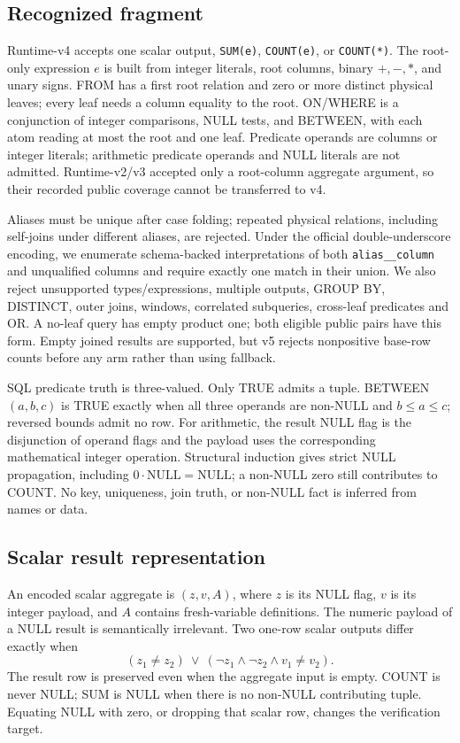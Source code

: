 \documentclass[3p,times,authoryear]{elsarticle}
\newcommand{\NULL}{\mathrm{NULL}}
\begin{document}
\subsection{Recognized fragment}
Runtime-v4 accepts one scalar output, \texttt{SUM(e)}, \texttt{COUNT(e)}, or \texttt{COUNT(*)}. The root-only expression $e$ is built from integer literals, root columns, binary $+,-,*$, and unary signs. FROM has a first root relation and zero or more distinct physical leaves; every leaf needs a column equality to the root. ON/WHERE is a conjunction of integer comparisons, NULL tests, and BETWEEN, with each atom reading at most the root and one leaf. Predicate operands are columns or integer literals; arithmetic predicate operands and NULL literals are not admitted. Runtime-v2/v3 accepted only a root-column aggregate argument, so their recorded public coverage cannot be transferred to v4.

Aliases must be unique after case folding; repeated physical relations, including self-joins under different aliases, are rejected. Under the official double-underscore encoding, we enumerate schema-backed interpretations of both \texttt{alias\_\_column} and unqualified columns and require exactly one match in their union. We also reject unsupported types/expressions, multiple outputs, GROUP BY, DISTINCT, outer joins, windows, correlated subqueries, cross-leaf predicates and OR. A no-leaf query has empty product one; both eligible public pairs have this form. Empty joined results are supported, but v5 rejects nonpositive base-row counts before any arm rather than using fallback.

SQL predicate truth is three-valued. Only TRUE admits a tuple. BETWEEN$(a,b,c)$ is TRUE exactly when all three operands are non-NULL and $b\le a\le c$; reversed bounds admit no row. For arithmetic, the result NULL flag is the disjunction of operand flags and the payload uses the corresponding mathematical integer operation. Structural induction gives strict NULL propagation, including $0\cdot\NULL=\NULL$; a non-NULL zero still contributes to COUNT. No key, uniqueness, join truth, or non-NULL fact is inferred from names or data.

\subsection{Scalar result representation}
An encoded scalar aggregate is $(z,v,A)$, where $z$ is its NULL flag, $v$ is its integer payload, and $A$ contains fresh-variable definitions. The numeric payload of a NULL result is semantically irrelevant. Two one-row scalar outputs differ exactly when
\begin{equation}
 (z_1\ne z_2)\ \lor\ (\neg z_1\land\neg z_2\land v_1\ne v_2).
 \label{eq:neq}
\end{equation}
The result row is preserved even when the aggregate input is empty. COUNT is never NULL; SUM is NULL when there is no non-NULL contributing tuple. Equating NULL with zero, or dropping that scalar row, changes the verification target.
\end{document}
